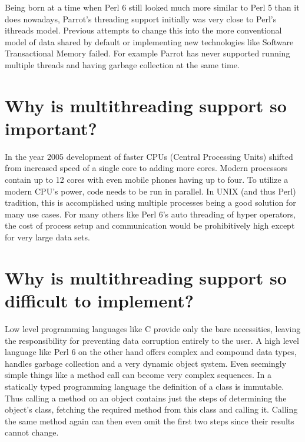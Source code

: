 \documentclass[bachelor,english]{hgbthesis}
\begin{document}
Being born at a time when Perl 6 still looked much more similar to Perl 5 than it does nowadays, Parrot's threading support initially was very close to Perl's ithreads model. Previous attempts to change this into the more conventional model of data shared by default or implementing new technologies like Software Transactional Memory failed. For example Parrot has never supported running multiple threads and having garbage collection at the same time.

\section{Why is multithreading support so important?}

In the year 2005 development of faster CPUs (Central Processing Units) shifted from increased speed of a single core to adding more cores. Modern processors contain up to 12 cores with even mobile phones having up to four. To utilize a modern CPU's power, code needs to be run in parallel. In UNIX (and thus Perl) tradition, this is accomplished using multiple processes being a good solution for many use cases. For many others like Perl 6's auto threading of hyper operators, the cost of process setup and communication would be prohibitively high except for very large data sets.

\section{Why is multithreading support so difficult to implement?}

Low level programming languages like C provide only the bare necessities, leaving the responsibility for preventing data corruption entirely to the user. A high level language like Perl 6 on the other hand offers complex and compound data types, handles garbage collection and a very dynamic object system. Even seemingly simple things like a method call can become very complex sequences. In a statically typed programming language the definition of a class is immutable. Thus calling a method on an object contains just the steps of determining the object's class, fetching the required method from this class and calling it. Calling the same method again can then even omit the first two steps since their results cannot change.
\end{document}

